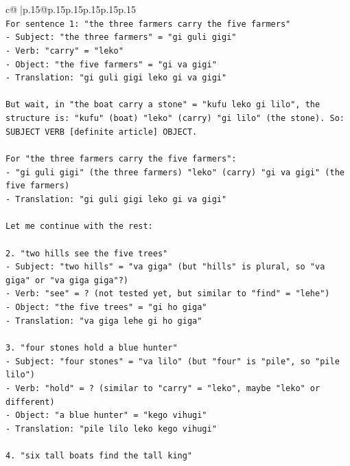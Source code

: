 \documentclass{article}
\begin{document}
{\begin{supertabular}{c@{$\;$}|p{.15\linewidth}@{}p{.15\linewidth}p{.15\linewidth}p{.15\linewidth}p{.15\linewidth}p{.15\linewidth}}
{{{\\ 
\texttt{For sentence 1: "the three farmers carry the five farmers"} \\
\texttt{{-} Subject: "the three farmers" = "gi guli gigi"} \\
\texttt{{-} Verb: "carry" = "leko"} \\
\texttt{{-} Object: "the five farmers" = "gi va gigi"} \\
\texttt{{-} Translation: "gi guli gigi leko gi va gigi"} \\
\\ 
\texttt{But wait, in "the boat carry a stone" = "kufu leko gi lilo", the structure is: "kufu" (boat) "leko" (carry) "gi lilo" (the stone). So: SUBJECT VERB {[}definite article{]} OBJECT.} \\
\\ 
\texttt{For "the three farmers carry the five farmers":} \\
\texttt{{-} "gi guli gigi" (the three farmers) "leko" (carry) "gi va gigi" (the five farmers)} \\
\texttt{{-} Translation: "gi guli gigi leko gi va gigi"} \\
\\ 
\texttt{Let me continue with the rest:} \\
\\ 
\texttt{2. "two hills see the five trees"} \\
\texttt{{-} Subject: "two hills" = "va giga" (but "hills" is plural, so "va giga" or "va giga giga"?)} \\
\texttt{{-} Verb: "see" = ? (not tested yet, but similar to "find" = "lehe")} \\
\texttt{{-} Object: "the five trees" = "gi ho giga"} \\
\texttt{{-} Translation: "va giga lehe gi ho giga"} \\
\\ 
\texttt{3. "four stones hold a blue hunter"} \\
\texttt{{-} Subject: "four stones" = "va lilo" (but "four" is "pile", so "pile lilo")} \\
\texttt{{-} Verb: "hold" = ? (similar to "carry" = "leko", maybe "leko" or different)} \\
\texttt{{-} Object: "a blue hunter" = "kego vihugi"} \\
\texttt{{-} Translation: "pile lilo leko kego vihugi"} \\
\\ 
\texttt{4. "six tall boats find the tall king"} \\
}}}
\end{supertabular}}
\end{document}
